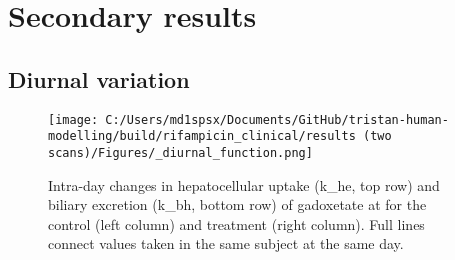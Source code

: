 \documentclass{epflreport}%
\begin{document}
\chapter{Secondary results}%
\section{Diurnal variation}%
\label{sec:Diurnalvariation}%

%


\begin{figure}[h!]%
\centering%
\texttt{[image: C:/Users/md1spsx/Documents/GitHub/tristan-human-modelling/build/rifampicin\_clinical/results (two scans)/Figures/\_diurnal\_function.png]}%
\caption{Intra{-}day changes in hepatocellular uptake (k\_he, top row) and biliary excretion (k\_bh, bottom row) of gadoxetate at for the control (left column) and treatment (right column). Full lines connect values taken in the same subject at the same day.}%
\end{figure}

%
\end{document}
